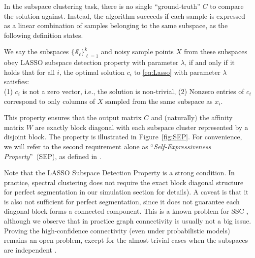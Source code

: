 \documentclass{ctexart}
\begin{document}
In the subspace clustering task, there is no single ``ground-truth'' $C$ to compare the solution against. Instead, the algorithm succeeds if each sample is expressed as a linear combination of samples belonging to the same subspace, as the following definition states.
\begin{definition}\label{def:lasso_detection}
We say the subspaces $\{\mathcal{S}_{\ell}\}_{\ell=1}^{k}$ and noisy sample points $X$ from these subspaces obey LASSO subspace detection property with parameter $\lambda$, if and only if it holds that for all $i$, the optimal solution $c_i$ to \eqref{eq:Lasso} with parameter $\lambda$ satisfies:\\
\indent (1) $c_i$ is not a zero vector, i.e., the solution is non-trivial,
\indent (2) Nonzero entries of $c_i$ correspond to only columns of $X$ sampled from the same subspace as $x_i$.
\end{definition}
This property ensures that the output matrix $C$ and (naturally) the affinity matrix $W$ are exactly block diagonal with each subspace cluster represented by a disjoint block.  The property is illustrated in Figure~\ref{fig:SEP}. For convenience, we will refer to the second requirement alone as ``\emph{Self-Expressiveness Property}''~(SEP), as defined in \cite{elhamifar2012ssc_journal}.

Note that the LASSO Subspace Detection Property is a strong condition. In practice, spectral clustering does not require the exact block diagonal structure for perfect segmentation in our simulation section for details). A caveat is that it is also not sufficient for perfect segmentation, since it does not guarantee each diagonal block forms a connected component. This is a known problem for SSC \cite{nasihatkon2011graph}, although we observe that in practice graph connectivity is usually not a big issue. Proving the high-confidence connectivity (even under probabilistic models) remains an open problem, except for the almost trivial cases when the subspaces are independent \cite{liu2013LRR, wang2013provable}.
\end{document}
